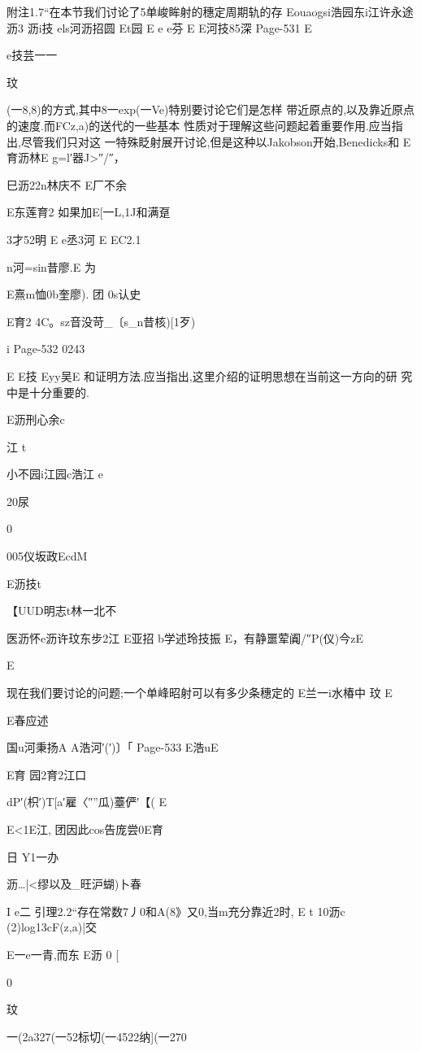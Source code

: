 {{附注1.7“在本节我们讨论了5单峻眸射的穗定周期轨的存
Eouaogsi浩园东i江许永途沥3
沥i技
els河沥招圆
Et园
E
e
e芬
E
E河技85深
Page-531
E

e技芸一一

玟

(一8,8)的方式,其中8一exp(一Ve)特别要讨论它们是怎样
带近原点的,以及靠近原点的速度.而FCz,a)的送代的一些基本
性质对于理解这些问题起着重要作用.应当指出,尽管我们只对这
一特殊眨射展开讨论,但是这种以Jakobson开始,Benedicks和
E育沥林E
g=l′器J>″/″，

巳沥22n林庆不
E厂不余

E东莲育2
如果加E[一L,1J和满趸

3才52明
E
e丞3河
E
EC2.1

n河=sin昔廖.E
为

E熹m恤0b奎廖).
团
0s认史

E育2
4C。sz音没苛_〔s_n昔核)[1歹)

i
Page-532
0243

E
E技
Eyy吴E
和证明方法.应当指出,这里介绍的证明思想在当前这一方向的研
究中是十分重要的.

E沥刑心余c

江
t

小不园i江园c浩江
e

20尿

0

005仪坂政EcdM

E沥技t

【UUD明志t林一北不

医沥怀e沥许玟东步2江
E亚招
b学述玲技振
E，有静噩荤阗/″P(仪)今zE

E

现在我们要讨论的问题;一个单峰昭射可以有多少条穗定的
E兰一i水椿中
玟
E

E春应述

国u河秉扬A
A浩河′(′)〕「
Page-533
E浩uE

E育
园2育2江口

dP′(枳′)T[a′雇〈″”瓜)薹俨′【(%
E

E<1E江,
团因此cos告庞尝0E育

日
Y1一办

沥…|<缪以及_旺沪蝴)卜春

I
e二
引理2.2“存在常数7丿0和A(8》又0,当m充分靠近2时,
E
t
10沥c
(2)log13cF(z,a)|交

E一e一青,而东
E沥
0
[

0

玟

一(2a327(一52标切(一4522纳](一270

}}
